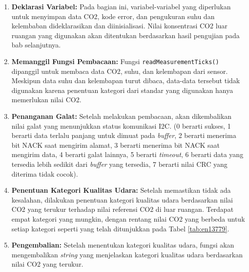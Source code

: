         \begin{enumerate}
            \item \textbf{Deklarasi Variabel:} Pada bagian ini, variabel-variabel yang diperlukan untuk menyimpan data CO2, kode error, dan pengukuran suhu dan kelembaban dideklarasikan dan diinisialisasi. Nilai konsentrasi CO2 luar ruangan yang digunakan akan ditentukan berdasarkan hasil pengujian pada bab selanjutnya.
        
            \item \textbf{Memanggil Fungsi Pembacaan:} Fungsi \texttt{readMeasurementTicks()} dipanggil untuk membaca data CO2, suhu, dan kelembapan dari sensor. Meskipun data suhu dan kelembapan turut dibaca, data-data tersebut tidak digunakan karena penentuan kategori dari standar yang digunakan hanya memerlukan nilai CO2. 
            
            \item \textbf{Penanganan Galat:} Setelah melakukan pembacaan, akan dikembalikan nilai galat yang menunjukkan status komunikasi I2C. (0 berarti sukses, 1 berarti data terlalu panjang untuk dimuat pada \textit{buffer}, 2 berarti menerima bit NACK saat mengirim alamat, 3 berarti menerima bit NACK saat mengirim data, 4 berarti galat lainnya, 5 berarti \textit{timeout}, 6 berarti data yang tersedia lebih sedikit dari \textit{buffer} yang tersedia, 7 berarti nilai CRC yang diterima tidak cocok).
            
            \item \textbf{Penentuan Kategori Kualitas Udara:} Setelah memastikan tidak ada kesalahan, dilakukan penentuan kategori kualitas udara berdasarkan nilai CO2 yang terukur terhadap nilai referensi CO2 di luar ruangan. Terdapat empat kategori yang mungkin, dengan rentang nilai CO2 yang berbeda untuk setiap kategori seperti yang telah ditunjukkan pada Tabel \ref{tab:en13779}.
            
            \item \textbf{Pengembalian:} Setelah menentukan kategori kualitas udara, fungsi akan mengembalikan \textit{string} yang menjelaskan kategori kualitas udara berdasarkan nilai CO2 yang terukur.
        \end{enumerate}
        
